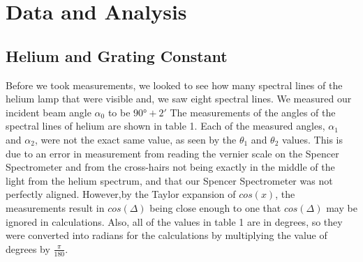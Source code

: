 \documentclass[a4paper]{article}
\begin{document}
\section{Data and Analysis}
\subsection{Helium and Grating Constant}
Before we took measurements, we looked to see how many spectral lines of the helium lamp that were visible and, we saw eight spectral lines. We measured our incident beam angle $\alpha_0$ to be $90°+2'$ The measurements of the angles of the spectral lines of helium are shown in table 1. Each of the measured angles, $\alpha_1$ and $\alpha_2$, were not the exact same value, as seen by the $\theta_1$ and $\theta_2$ values. This is due to an error in measurement from reading the vernier scale on the Spencer Spectrometer and from the cross-hairs not being exactly in the middle of the light from the helium spectrum, and that our Spencer Spectrometer was not perfectly aligned. However,by the Taylor expansion of $cos(x)$, the measurements result in $cos(\Delta)$ being close enough to one that $cos(\Delta)$ may be ignored in calculations. Also, all of the values in table 1 are in degrees, so they were converted into radians for the calculations by multiplying the value of degrees by $\frac{\pi}{180}$.
\end{document}
